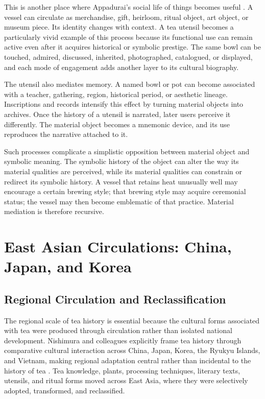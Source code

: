 \documentclass[numbers]{IntechOpen-Book}
\begin{document}
This is another place where Appadurai's social life of things becomes useful \cite{appadurai}. A vessel can circulate as merchandise, gift, heirloom, ritual object, art object, or museum piece. Its identity changes with context. A tea utensil becomes a particularly vivid example of this process because its functional use can remain active even after it acquires historical or symbolic prestige. The same bowl can be touched, admired, discussed, inherited, photographed, catalogued, or displayed, and each mode of engagement adds another layer to its cultural biography.

The utensil also mediates memory. A named bowl or pot can become associated with a teacher, gathering, region, historical period, or aesthetic lineage. Inscriptions and records intensify this effect by turning material objects into archives. Once the history of a utensil is narrated, later users perceive it differently. The material object becomes a mnemonic device, and its use reproduces the narrative attached to it.

Such processes complicate a simplistic opposition between material object and symbolic meaning. The symbolic history of the object can alter the way its material qualities are perceived, while its material qualities can constrain or redirect its symbolic history. A vessel that retains heat unusually well may encourage a certain brewing style; that brewing style may acquire ceremonial status; the vessel may then become emblematic of that practice. Material mediation is therefore recursive.

\section{East Asian Circulations: China, Japan, and Korea}

\subsection{Regional Circulation and Reclassification}

The regional scale of tea history is essential because the cultural forms associated with tea were produced through circulation rather than isolated national development. Nishimura and colleagues explicitly frame tea history through comparative cultural interaction across China, Japan, Korea, the Ryukyu Islands, and Vietnam, making regional adaptation central rather than incidental to the history of tea \cite{nishimura}. Tea knowledge, plants, processing techniques, literary texts, utensils, and ritual forms moved across East Asia, where they were selectively adopted, transformed, and reclassified.
\end{document}
